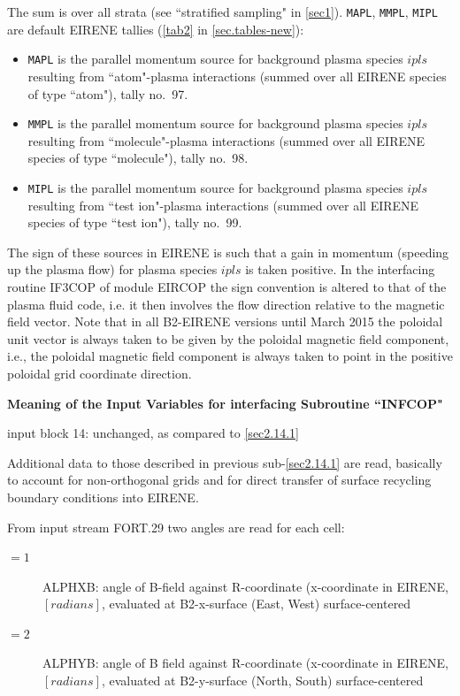 The sum is over all strata (see  ``stratified sampling" in \cref{sec1}).
\lstinline|MAPL|, \lstinline|MMPL|,  \lstinline|MIPL| are
default EIRENE tallies (\cref{tab2} in \cref{sec.tables-new}):
\begin{itemize}
  \item \lstinline|MAPL| is the parallel momentum source for background
        plasma species $ipls$ resulting from ``atom"-plasma interactions (summed over
        all EIRENE species of type ``atom"), tally no.\ 97.
  \item \lstinline|MMPL| is the parallel momentum source for background
        plasma species $ipls$ resulting from ``molecule"-plasma interactions (summed
        over all EIRENE species of type ``molecule"), tally no.\ 98.
  \item \lstinline|MIPL| is the parallel momentum source for background
        plasma species $ipls$ resulting from ``test ion"-plasma interactions (summed
        over all EIRENE species of type ``test ion"), tally no.\ 99.
\end{itemize}
The sign of these sources in EIRENE is such that a gain in momentum (speeding
up the plasma flow) for plasma species $ipls$ is taken positive.
In the interfacing routine IF3COP of module EIRCOP the sign convention is
altered to that of the plasma fluid code, i.e. it then involves the flow
direction relative to the magnetic field vector.
Note that in all B2-EIRENE versions until March 2015 the poloidal unit vector
is always taken to be given by the poloidal magnetic field component, i.e., the
poloidal magnetic field component is always taken to point in the positive
poloidal grid coordinate direction.

\textbf{Meaning of the Input Variables for interfacing Subroutine ``INFCOP"}

\medskip

input block 14: unchanged, as compared to \cref{sec2.14.1}

\medskip

Additional data to those described in previous sub-\cref{sec2.14.1} are read,
basically to account for non-orthogonal grids and for direct transfer of
surface recycling boundary conditions into EIRENE.

From input stream FORT.29 two angles are read for each cell:
\begin{description}
  \item[$= 1$] ALPHXB: angle of B-field against R-coordinate (x-coordinate in
        EIRENE, $[radians]$,  evaluated at B2-x-surface (East, West)  surface-centered
  \item[$= 2$] ALPHYB: angle of B field against R-coordinate (x-coordinate in
        EIRENE, $[radians]$,  evaluated at B2-y-surface (North, South) surface-centered
\end{description}

